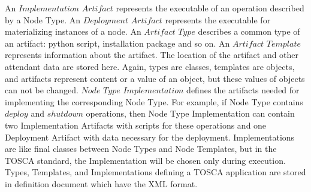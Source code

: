An $Implementation$ $Artifact$ represents the executable of an operation described by a Node Type.
An $Deployment$ $Artifact$ represents the executable for materializing instances of a node.
An $Artifact$ $Type$ describes a common type of an artifact: python script, installation package and so on.
An $Artifact$ $Template$ represents information about the artifact. 
The location of the artifact and other attendant data are stored here. 
Again, types are classes, templates are objects, and artifacts represent content or a value of an object, but these values of objects can not be changed. %
$Node$ $Type$ $Implementation$ defines the artifacts needed for implementing the corresponding Node Type.
For example, if Node Type contains $deploy$ and $shutdown$ operations, then Node Type Implementation can contain two Implementation Artifacts with scripts for these operations and one Deployment Artifact with data necessary for the deployment. %
Implementations are like final classes between Node Types and Node Templates, but in the TOSCA standard, the Implementation will be chosen only during execution.
Types, Templates, and Implementations defining a TOSCA application are stored in definition document which have the XML format. %
